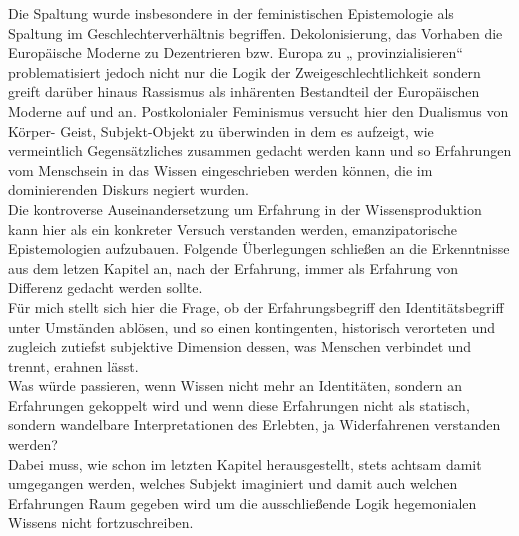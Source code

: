 \noindent Die Spaltung wurde insbesondere in der feministischen
Epistemologie als Spaltung im Geschlechterverhältnis begriffen.
Dekolonisierung, das Vorhaben die  Europäische Moderne zu Dezentrieren bzw.
Europa zu „ provinzialisieren“\footnotemark
{} problematisiert jedoch nicht nur die Logik der
Zweigeschlechtlichkeit sondern greift darüber hinaus Rassismus als inhärenten
Bestandteil der Europäischen Moderne auf und an. Postkolonialer Feminismus
versucht hier den Dualismus von Körper- Geist, Subjekt-Objekt zu überwinden in
dem es aufzeigt, wie vermeintlich Gegensätzliches zusammen gedacht werden kann
und so Erfahrungen vom Menschsein in das Wissen eingeschrieben werden können,
die im dominierenden Diskurs negiert wurden. \\
Die kontroverse Auseinandersetzung
um Erfahrung in der Wissensproduktion kann hier als ein konkreter Versuch
verstanden werden, emanzipatorische Epistemologien aufzubauen. Folgende Überlegungen schließen an die Erkenntnisse aus dem letzen Kapitel an, nach der Erfahrung, immer als Erfahrung von Differenz gedacht werden sollte. \\
Für mich stellt sich hier die Frage, ob der Erfahrungsbegriff den
Identitätsbegriff unter Umständen ablösen, und so einen kontingenten,
historisch verorteten und zugleich zutiefst subjektive Dimension dessen, was
Menschen verbindet und trennt, erahnen lässt.\\
Was würde passieren, wenn Wissen nicht mehr an
Identitäten, sondern an Erfahrungen gekoppelt wird und wenn diese Erfahrungen
nicht als statisch, sondern wandelbare Interpretationen des Erlebten, ja
Widerfahrenen verstanden werden?\\
Dabei muss, wie schon im letzten
Kapitel herausgestellt, stets achtsam damit umgegangen werden, welches Subjekt
imaginiert und damit auch welchen Erfahrungen Raum gegeben wird um die
ausschließende Logik hegemonialen Wissens nicht fortzuschreiben.\\ 



